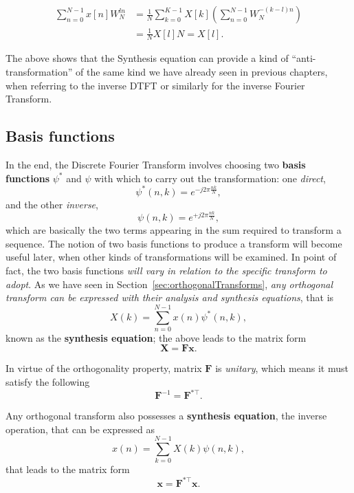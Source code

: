 \documentclass[\documentfontsize, twocolumn]{\classname}
\begin{document}
\begin{align*}
    \sum_{n=0}^{N-1} x[n] W_N^{ln}
    &= \frac 1 N \sum_{k=0}^{K-1} X[k] \left(\sum_{n=0}^{N-1}W_N^{-(k-l)n}\right)\\
    &= \frac 1 N X[l] N = X[l].
\end{align*}

The above shows that the Synthesis equation can provide a kind of ``anti-transformation'' of the same kind we have already seen in previous chapters, when referring to the inverse DTFT or similarly for the inverse Fourier Transform.

\subsection{Basis functions}\label{sec:basisFunctions}

In the end, the Discrete Fourier Transform involves choosing two \textbf{basis functions} $\psi^*$ and $\psi$ with which to carry out the transformation: one \emph{direct},
\[
    \psi^*(n, k) = e^{-j 2\pi \frac{nk}{N}},
\]
and the other \emph{inverse},
\[
    \psi(n, k) = e^{+j 2\pi \frac{nk}{N}},
\]
which are basically the two terms appearing in the sum required to transform a sequence. The notion of two basis functions to produce a transform will become useful later, when other kinds of transformations will be examined. In point of fact, the two basis functions \emph{will vary in relation to the specific transform to adopt}. As we have seen in Section~\ref{sec:orthogonalTransforms}, \emph{any orthogonal transform can be expressed with their analysis and synthesis equations}, that is
\begin{equation}\label{eqn:analysisEquation}
    X(k) = \sum_{n=0}^{N-1} x(n)\psi^*(n, k),
\end{equation}
known as the \textbf{synthesis equation}; the above leads to the matrix form
\begin{equation}\label{eqn:analysisEquationMatrixForm}
    \bm{X} = \bm{Fx}.
\end{equation}

In virtue of the orthogonality property, matrix $\bm{F}$ is \emph{unitary}, which means it must satisfy the following
\begin{equation}\label{eqn:unitaryMatrix}
    \bm{F}^{-1} = \bm{F}^{*\top}.
\end{equation}

Any orthogonal transform also possesses a \textbf{synthesis equation}, the inverse operation, that can be expressed as
\begin{equation}\label{eqn:synthesisEquation}
    x(n) = \sum_{k=0}^{N-1} X(k)\psi(n, k),
\end{equation}
that leads to the matrix form
\begin{equation}\label{eqn:synthesisEquationMatrixForm}
    \bm{x} = \bm{F}^{*\top}\bm{x}.
\end{equation}
\end{document}
